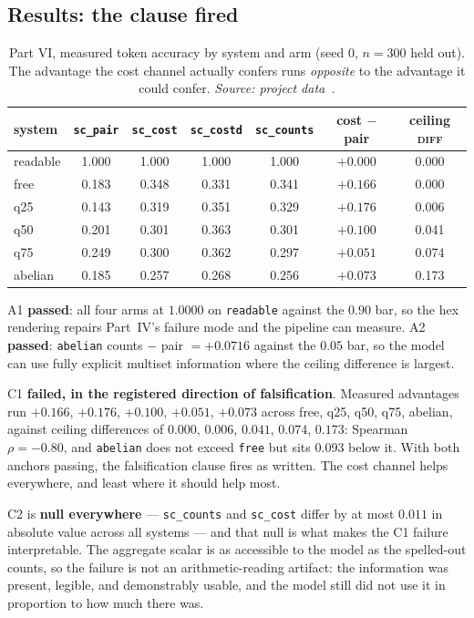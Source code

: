 \subsection{Results: the clause fired}

\begin{table}[htbp]
\centering\footnotesize
\caption{Part VI, measured token accuracy by system and arm (seed 0, $n=300$ held out). The advantage the cost channel actually confers runs \emph{opposite} to the advantage it could confer. \emph{Source: project data~\cite{appliedrepo2026}.}}
\label{tab:ccmain}
\begin{tabular}{lcccccc}
\toprule
system & \texttt{sc\_pair} & \texttt{sc\_cost} & \texttt{sc\_costd} & \texttt{sc\_counts} & cost $-$ pair & ceiling \textsc{diff} \\
\midrule
readable & 1.000 & 1.000 & 1.000 & 1.000 & $+0.000$ & 0.000 \\
free & 0.183 & 0.348 & 0.331 & 0.341 & $+0.166$ & 0.000 \\
q25 & 0.143 & 0.319 & 0.351 & 0.329 & $+0.176$ & 0.006 \\
q50 & 0.201 & 0.301 & 0.363 & 0.301 & $+0.100$ & 0.041 \\
q75 & 0.249 & 0.300 & 0.362 & 0.297 & $+0.051$ & 0.074 \\
abelian & 0.185 & 0.257 & 0.268 & 0.256 & $+0.073$ & 0.173 \\
\bottomrule
\end{tabular}
\end{table}

A1 \textbf{passed}: all four arms at $1.0000$ on \texttt{readable} against the $0.90$ bar, so the hex rendering repairs Part~IV's failure mode and the pipeline can measure. A2 \textbf{passed}: \texttt{abelian} counts $-$ pair $= +0.0716$ against the $0.05$ bar, so the model can use fully explicit multiset information where the ceiling difference is largest.

C1 \textbf{failed, in the registered direction of falsification}. Measured advantages run $+0.166$, $+0.176$, $+0.100$, $+0.051$, $+0.073$ across free, q25, q50, q75, abelian, against ceiling differences of $0.000$, $0.006$, $0.041$, $0.074$, $0.173$: Spearman $\rho = -0.80$, and \texttt{abelian} does not exceed \texttt{free} but sits $0.093$ below it. With both anchors passing, the falsification clause fires as written. The cost channel helps everywhere, and least where it should help most.

C2 is \textbf{null everywhere} --- \texttt{sc\_counts} and \texttt{sc\_cost} differ by at most $0.011$ in absolute value across all systems --- and that null is what makes the C1 failure interpretable. The aggregate scalar is as accessible to the model as the spelled-out counts, so the failure is not an arithmetic-reading artifact: the information was present, legible, and demonstrably usable, and the model still did not use it in proportion to how much there was.

